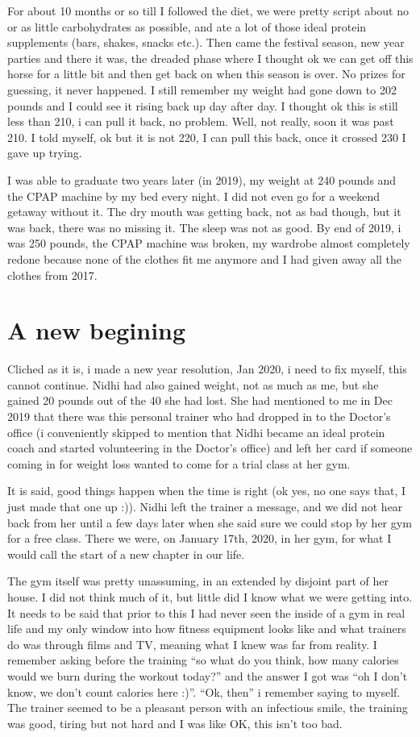\documentclass[oneside]{book}
\begin{document}
For about 10 months or so till I followed the diet, we were pretty
script about no or as little carbohydrates as possible, and ate a lot of
those ideal protein supplements (bars, shakes, snacks etc.). Then came
the festival season, new year parties and there it was, the dreaded
phase where I thought ok we can get off this horse for a little bit and
then get back on when this season is over. No prizes for guessing, it
never happened. I still remember my weight had gone down to 202 pounds
and I could see it rising back up day after day. I thought ok this is
still less than 210, i can pull it back, no problem. Well, not really,
soon it was past 210. I told myself, ok but it is not 220, I can pull
this back, once it crossed 230 I gave up trying.

I was able to graduate two years later (in 2019), my weight at 240
pounds and the CPAP machine by my bed every night. I did not even go for
a weekend getaway without it. The dry mouth was getting back, not as bad
though, but it was back, there was no missing it. The sleep was not as
good. By end of 2019, i was 250 pounds, the CPAP machine was broken, my
wardrobe almost completely redone because none of the clothes fit me
anymore and I had given away all the clothes from 2017.

\section{A new begining}\label{a-new-begining}

Cliched as it is, i made a new year resolution, Jan 2020, i need to fix
myself, this cannot continue. Nidhi had also gained weight, not as much
as me, but she gained 20 pounds out of the 40 she had lost. She had
mentioned to me in Dec 2019 that there was this personal trainer who had
dropped in to the Doctor's office (i conveniently skipped to mention
that Nidhi became an ideal protein coach and started volunteering in the
Doctor's office) and left her card if someone coming in for weight loss
wanted to come for a trial class at her gym.

It is said, good things happen when the time is right (ok yes, no one
says that, I just made that one up :)). Nidhi left the trainer a
message, and we did not hear back from her until a few days later when
she said sure we could stop by her gym for a free class. There we were,
on January 17th, 2020, in her gym, for what I would call the start of a
new chapter in our life.

The gym itself was pretty unassuming, in an extended by disjoint part of
her house. I did not think much of it, but little did I know what we
were getting into. It needs to be said that prior to this I had never
seen the inside of a gym in real life and my only window into how
fitness equipment looks like and what trainers do was through films and
TV, meaning what I knew was far from reality. I remember asking before
the training ``so what do you think, how many calories would we burn
during the workout today?'' and the answer I got was ``oh I don't know,
we don't count calories here :)''. ``Ok, then'' i remember saying to
myself. The trainer seemed to be a pleasant person with an infectious
smile, the training was good, tiring but not hard and I was like OK,
this isn't too bad.
\end{document}
